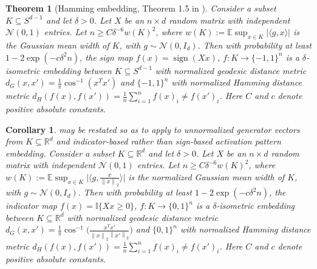 \documentclass{article} %
\newcommand{\twonorm}[1]{\left\|#1\right\|_{2}}
\DeclareMathOperator{\sign}{sign}
\newcommand{\n}{\ensuremath{n}}
\newcommand{\datadim}{\ensuremath{d}}
\newcommand{\X}{\ensuremath{X}}
\newtheorem{theorem}{Theorem}
\newtheorem{corollary}{Corollary}
\newcommand{\1}{\ensuremath{{\sf (i)}}}
\newcommand{\2}{\ensuremath{{\sf (ii)}}}
\newcommand{\3}{\ensuremath{{\sf (iii)}}}
\newcommand{\4}{\ensuremath{{\sf (iv)}}}
\newcommand{\5}{\ensuremath{{\sf (v)}}}
\newcommand{\6}{\ensuremath{{\sf (vi)}}}
\newcommand{\R}{\mathbb{R}}
\begin{document}
\begin{theorem}[Hamming embedding, Theorem 1.5 in \citet{tessellation}]
\label{thm:Hamming embedding}
    Consider a subset $K \subseteq S^{\datadim-1}$ and let $\delta > 0$. Let $\X$ be an $\n \times \datadim$ random matrix with independent $\mathcal{N}(0,1)$ entries. Let $\n \geq C\delta^{-6}w(K)^2$, where $w(K) := \mathbb{E}\sup_{x\in K}\vert\langle g, x \rangle\vert$ is the Gaussian mean width of $K$, with $g \sim \mathcal{N}(0, I_\datadim)$.
    Then with probability at least $1 - 2\exp(-c\delta^2\n)$, the sign map $f(x) = \sign(\X x)$, $f: K \rightarrow \{-1, 1\}^\n$ is a $\delta$-isometric embedding between $K \subseteq S^{\datadim-1}$ with normalized geodesic distance metric $d_G(x, x') = \frac{1}{\pi}\cos^{-1}( x^Tx')$ and $\{-1,1\}^\n$ with normalized Hamming distance metric $d_H(f(x), f(x')) = \frac{1}{\n}\sum_{i=1}^\n f(x)_i\neq f(x')_i$. Here $C$ and $c$ denote positive absolute constants.
\end{theorem}
\begin{corollary}\label{cor:hamming_unnormalized_01}
 may be restated so as to apply to unnormalized generator vectors from $K \subseteq \R^\datadim$ and indicator-based rather than sign-based activation pattern embedding.
Consider a subset $K \subseteq \R^{\datadim}$ and let $\delta > 0$. Let $\X$ be an $\n \times \datadim$ random matrix with independent $\mathcal{N}(0,1)$ entries. Let $\n \geq C\delta^{-6}w(K)^2$, where $w(K) := \mathbb{E}\sup_{x\in K}\vert\langle g, \frac{x}{\twonorm{x}} \rangle\vert$ is the normalized Gaussian mean width of $K$, with $g \sim \mathcal{N}(0, I_\datadim)$.
Then with probability at least $1 - 2\exp(-c\delta^2\n)$, the indicator map $f(x) = \mathbb{I}\{\X x \geq 0\}$, $f: K \rightarrow \{0, 1\}^\n$ is a $\delta$-isometric embedding between $K \subseteq \R^{\datadim}$ with normalized geodesic distance metric $d_G(x, x') = \frac{1}{\pi}\cos^{-1}\big( \frac{x^Tx'}{\twonorm{x}\twonorm{x'}} \big)$ and $\{0,1\}^\n$ with normalized Hamming distance metric $d_H(f(x), f(x')) = \frac{1}{\n}\sum_{i=1}^\n f(x)_i\neq f(x')_i$. Here $C$ and $c$ denote positive absolute constants.
\end{corollary}
\end{document}
